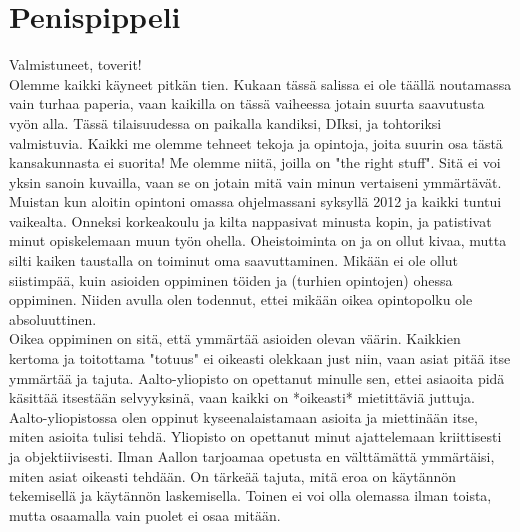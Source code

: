 \documentclass[a4paper, 12pt, finnish]{report}
\newcommand{\topic}{Penispippeli}
\begin{document}
\section*{\topic}
Valmistuneet, toverit!\\

Olemme kaikki käyneet pitkän tien.
Kukaan tässä salissa ei ole täällä noutamassa vain turhaa paperia, vaan kaikilla on tässä vaiheessa jotain suurta saavutusta vyön alla.
Tässä tilaisuudessa on paikalla kandiksi, DIksi, ja tohtoriksi valmistuvia.
Kaikki me olemme tehneet tekoja ja opintoja, joita suurin osa tästä kansakunnasta ei suorita!
Me olemme niitä, joilla on "the right stuff". Sitä ei voi yksin sanoin kuvailla, vaan se on jotain mitä vain minun vertaiseni ymmärtävät.\\

Muistan kun aloitin opintoni omassa ohjelmassani syksyllä 2012 ja kaikki tuntui vaikealta.
Onneksi korkeakoulu ja kilta nappasivat minusta kopin, ja patistivat minut opiskelemaan muun työn ohella.
Oheistoiminta on ja on ollut kivaa, mutta silti kaiken taustalla on toiminut oma saavuttaminen.
Mikään ei ole ollut siistimpää, kuin asioiden oppiminen töiden ja (turhien opintojen) ohessa oppiminen.
Niiden avulla olen todennut, ettei mikään oikea opintopolku ole absoluuttinen.\\

Oikea oppiminen on sitä, että ymmärtää asioiden olevan väärin.
Kaikkien kertoma ja toitottama "totuus" ei oikeasti olekkaan just niin, vaan asiat pitää itse ymmärtää ja tajuta.
Aalto-yliopisto on opettanut minulle sen, ettei asiaoita pidä käsittää itsestään selvyyksinä, vaan kaikki on *oikeasti* mietittäviä juttuja.\\

Aalto-yliopistossa olen oppinut kyseenalaistamaan asioita ja miettinään itse, miten asioita tulisi tehdä.
Yliopisto on opettanut minut ajattelemaan kriittisesti ja objektiivisesti.
Ilman Aallon tarjoamaa opetusta en välttämättä ymmärtäisi, miten asiat oikeasti tehdään.
On tärkeää tajuta, mitä eroa on käytännön tekemisellä ja käytännön laskemisella.
Toinen ei voi olla olemassa ilman toista, mutta osaamalla vain puolet ei osaa mitään.\\
\end{document}
